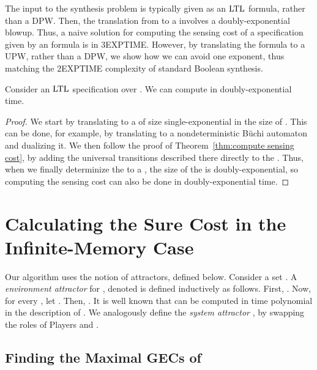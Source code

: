 \documentclass[runningheads,a4paper]{llncs}
\newcommand{\LTL}{{\ensuremath{\rm LTL}}\xspace}
\newcommand{\DPW}{\mbox{\rm DPW}\xspace}
\newcommand{\UPW}{\mbox{\rm UPW}\xspace}
\newcommand{\buchi}{B\"uchi\xspace}
\newcommand{\gecs}{{GECs}\xspace}
\begin{document}
The input to the synthesis problem is typically given as an \LTL formula, rather than a \DPW. Then, the translation from  to a  involves a doubly-exponential blowup. Thus, a naive solution for computing the sensing cost of a specification given by an  formula is in 3EXPTIME. However, by translating the formula to a \UPW, rather than a \DPW, we show how we can avoid one exponent, thus matching the 2EXPTIME complexity of standard Boolean synthesis.
\vspace*{-5pt}
\begin{theorem}
\label{thm:LTL sensing cost}
Consider an \LTL specification  over . We can compute  in doubly-exponential time.
\end{theorem}
\vspace*{-12pt}
\begin{proof}
We start by translating  to a   of size single-exponential in the size of . This can be done, for example, by translating  to a nondeterministic \buchi automaton~\cite{VW94} and dualizing it. We then follow the proof of Theorem~\ref{thm:compute sensing cost}, by adding the universal transitions described there directly to the  . Thus, when we finally determinize the  to a , the size of the  is doubly-exponential, 
so 
computing the sensing cost can also be done in doubly-exponential time.
\end{proof}

\small



\normalsize

\appendix

\section{Calculating the Sure Cost in the Infinite-Memory Case}
\label{app inf memory}

Our algorithm uses the notion of attractors, defined below.
Consider a set . A {\em environment attractor} for , denoted  is defined inductively as follows. First, . Now, for every , let . Then, . It is well known that  can be computed in time polynomial in the description of . We analogously define the {\em system attractor} , by swapping the roles of Players  and .

\subsection{Finding the Maximal \gecs of }
\label{app inf memory finding gecs}
\end{document}

